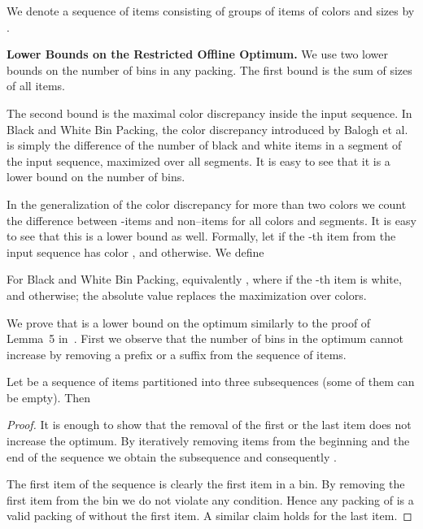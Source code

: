 \documentclass[11pt,a4paper]{article}
\begin{document}
We denote a sequence of  items consisting of  groups of  items of colors  and sizes
 by .

\medskip

\textbf{Lower Bounds on the Restricted Offline Optimum.}
We use two lower bounds on the number of bins in any packing. The first bound
 is the sum of sizes of all items.

The second bound  is the maximal color discrepancy inside
the input sequence.  In Black and White Bin Packing, the color
discrepancy introduced by Balogh et al.~\cite{balogh14} is simply the
difference of the number of black and white items in a segment of
the input sequence, maximized over all segments.  It is easy to see that
it is a lower bound on the number of bins.

In the generalization of the color discrepancy for more than two colors we
count the difference between -items and non--items for all
colors  and segments. It is easy to see that this is a lower bound
as well. Formally, let  if the -th item from the input
sequence has color , and  otherwise. We define

For Black and White Bin Packing, equivalently 
,
where  if the -th item is white, and  otherwise; the
absolute value replaces the maximization over colors.

We prove that  is a lower bound on the optimum similarly to the proof of Lemma~5 in~\cite{balogh14}.
First we observe that the number of bins in the optimum cannot increase by removing a prefix or a suffix
from the sequence of items.

\begin{observation}
Let  be a sequence of items partitioned into three subsequences (some of them can be empty).
Then  
\end{observation}

\begin{proof}
It is enough to show that the removal of the first or the last item does not increase the optimum. 
By iteratively removing items from the beginning and the end of the sequence we obtain the subsequence 
and consequently .

The first item of the sequence is clearly the first item in a bin. By removing the first item from the bin we do not violate any condition.
Hence any packing of  is a valid packing of  without the first item.
A similar claim holds for the last item.
\end{proof}

\begin{lemma}
 
\end{lemma}
\end{document}
